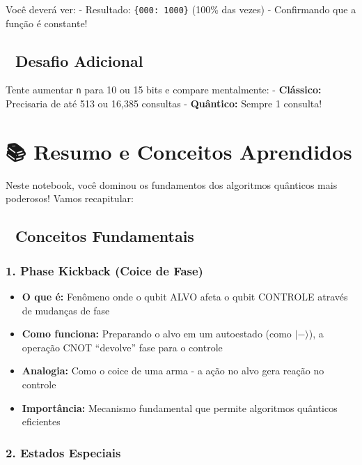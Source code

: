 \documentclass[
  brazilian,
]{report}
\providecommand{\tightlist}{%
  \setlength{\itemsep}{0pt}\setlength{\parskip}{0pt}}
\begin{document}
Você deverá ver: - Resultado:
\texttt{\{\textquotesingle{}000\textquotesingle{}:\ 1000\}} (100\% das
vezes) - Confirmando que a função é constante!

\subsection{🧪 Desafio Adicional}\label{desafio-adicional}

Tente aumentar \texttt{n} para 10 ou 15 bits e compare mentalmente: -
\textbf{Clássico:} Precisaria de até 513 ou 16,385 consultas -
\textbf{Quântico:} Sempre 1 consulta! 🚀

\section{📚 Resumo e Conceitos
Aprendidos}\label{resumo-e-conceitos-aprendidos}

Neste notebook, você dominou os fundamentos dos algoritmos quânticos
mais poderosos! Vamos recapitular:

\subsection{🎯 Conceitos Fundamentais}\label{conceitos-fundamentais}

\subsubsection{\texorpdfstring{1. \textbf{Phase Kickback (Coice de
Fase)}}{1. Phase Kickback (Coice de Fase)}}\label{phase-kickback-coice-de-fase}

\begin{itemize}
\tightlist
\item
  \textbf{O que é:} Fenômeno onde o qubit ALVO afeta o qubit CONTROLE
  através de mudanças de fase
\item
  \textbf{Como funciona:} Preparando o alvo em um autoestado (como
  \(|-\rangle\)), a operação CNOT ``devolve'' fase para o controle
\item
  \textbf{Analogia:} Como o coice de uma arma - a ação no alvo gera
  reação no controle
\item
  \textbf{Importância:} Mecanismo fundamental que permite algoritmos
  quânticos eficientes
\end{itemize}

\subsubsection{\texorpdfstring{2. \textbf{Estados
Especiais}}{2. Estados Especiais}}\label{estados-especiais}
\end{document}
